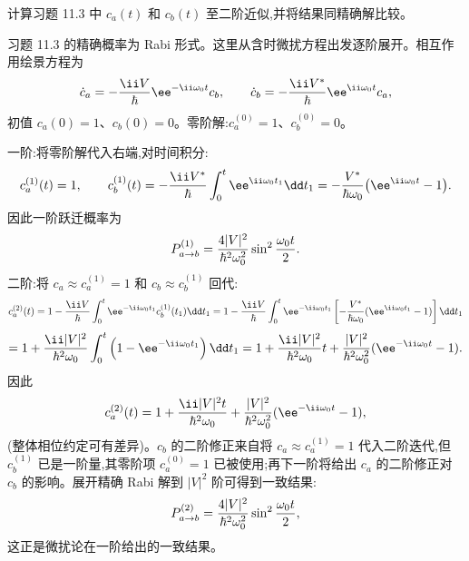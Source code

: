 \begin{question}
计算习题 11.3 中 $c_a(t)$ 和 $c_b(t)$ 至二阶近似,并将结果同精确解比较。
\begin{solution}
习题 11.3 的精确概率为 Rabi 形式。这里从含时微扰方程出发逐阶展开。相互作用绘景方程为
\[
\dot c_a=-{\ii V\over\hbar}\ee^{-\ii\omega_0t}c_b,\qquad
\dot c_b=-{\ii V^*\over\hbar}\ee^{\ii\omega_0t}c_a,
\]
初值 $c_a(0)=1$、$c_b(0)=0$。零阶解:$c_a^{(0)}=1$、$c_b^{(0)}=0$。

一阶:将零阶解代入右端,对时间积分:
\[
c_a^{(1)}(t)=1,\qquad
c_b^{(1)}(t)=-{\ii V^*\over\hbar}\int_0^t \ee^{\ii\omega_0t_1}\dd t_1
=-{V^*\over\hbar\omega_0}\big(\ee^{\ii\omega_0t}-1\big).
\]
因此一阶跃迁概率为
\[
P_{a\to b}^{(1)}={4|V|^2\over\hbar^2\omega_0^2}\sin^2{\omega_0t\over2}.
\]
二阶:将 $c_a\approx c_a^{(1)}=1$ 和 $c_b\approx c_b^{(1)}$ 回代:
\[
c_a^{(2)}(t)=1-{\ii V\over\hbar}\int_0^t \ee^{-\ii\omega_0t_1}c_b^{(1)}(t_1)\dd t_1
=1-{\ii V\over\hbar}\int_0^t \ee^{-\ii\omega_0t_1}\left[-{V^*\over\hbar\omega_0}(\ee^{\ii\omega_0t_1}-1)\right]\dd t_1
\]
\[
=1+{\ii|V|^2\over\hbar^2\omega_0}\int_0^t\left(1-\ee^{-\ii\omega_0t_1}\right)\dd t_1
=1+{\ii|V|^2\over\hbar^2\omega_0}t+{|V|^2\over\hbar^2\omega_0^2}(\ee^{-\ii\omega_0t}-1).
\]
因此
\[
c_a^{(2)}(t)=1+{\ii |V|^2t\over\hbar^2\omega_0}+{ |V|^2\over\hbar^2\omega_0^2}(\ee^{-\ii\omega_0t}-1),
\]
(整体相位约定可有差异)。$c_b$ 的二阶修正来自将 $c_a\approx c_a^{(1)}=1$ 代入二阶迭代,但 $c_b^{(1)}$ 已是一阶量,其零阶项 $c_a^{(0)}=1$ 已被使用;再下一阶将给出 $c_a$ 的二阶修正对 $c_b$ 的影响。展开精确 Rabi 解到 $|V|^2$ 阶可得到一致结果:
\[
P_{a\to b}^{(2)}={4|V|^2\over\hbar^2\omega_0^2}\sin^2{\omega_0t\over2},
\]
这正是微扰论在一阶给出的一致结果。
\end{solution}
\end{question}

